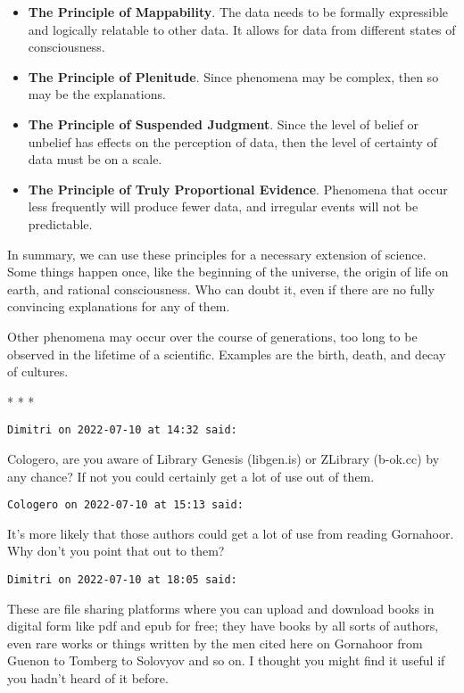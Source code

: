 \begin{itemize}
\item \textbf{The Principle of Mappability}. The data needs to be formally expressible and logically relatable to other
data. It allows for data from different states of consciousness. 
\item \textbf{The Principle of Plenitude}. Since phenomena may be complex, then so may be the explanations. 
\item \textbf{The Principle of Suspended Judgment}. Since the level of belief or unbelief has effects on the perception
of data, then the level of certainty of data must be on a scale. 
\item \textbf{The Principle of Truly Proportional Evidence}. Phenomena that occur less frequently will produce fewer
data, and irregular events will not be predictable. 
\end{itemize}
In summary, we can use these principles for a necessary extension of science. Some things happen once, like the
beginning of the universe, the origin of life on earth, and rational consciousness. Who can doubt it, even if there are
no fully convincing explanations for any of them.

Other phenomena may occur over the course of generations, too long to be observed in the lifetime of a scientific.
Examples are the birth, death, and decay of cultures.


\begin{center}* * *\end{center}

\begin{footnotesize}\begin{sffamily}
\texttt{Dimitri on 2022-07-10 at 14:32 said: }

Cologero, are you aware of Library Genesis (libgen.is) or ZLibrary (b-ok.cc) by any chance? If not you could certainly
get a lot of use out of them.

\hfill

\texttt{Cologero on 2022-07-10 at 15:13 said: }

It's more likely that those authors could get a lot of use from reading Gornahoor. Why don't you
point that out to them?

\hfill

\texttt{Dimitri on 2022-07-10 at 18:05 said: }

These are file sharing platforms where you can upload and download books in digital form like pdf and epub for free;
they have books by all sorts of authors, even rare works or things written by the men cited here on Gornahoor from
Guenon to Tomberg to Solovyov and so on. I thought you might find it useful if you hadn't heard of it
before.

\hfill

\end{sffamily}\end{footnotesize}